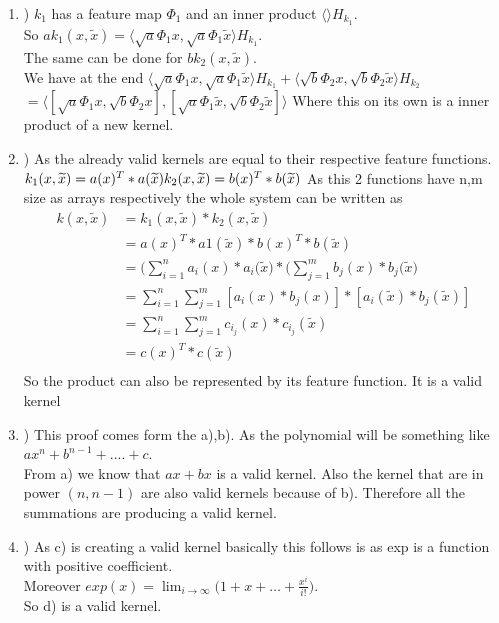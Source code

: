 \begin{enumerate}[label=\alph*]
\item) $k_1$ has a feature map $\Phi_1$ and an inner product $\langle\rangle H_{k_1}$.\\
So $ak_1(x,\widetilde{x}) = \langle \sqrt{a}\Phi_1{x}, \sqrt{a}\Phi_1{\widetilde{x}} \rangle H_{k_1}$. \\
The same can be done for $bk_2(x,\widetilde{x})$.\\
We have at the end 
$\langle \sqrt{a}\Phi_1{x}, \sqrt{a}\Phi_1{\widetilde{x}} \rangle H_{k_1} + \langle \sqrt{b}\Phi_2{x}, \sqrt{b}\Phi_2{\widetilde{x}} \rangle H_{k_2}$\\
$= \langle [\sqrt{a}\Phi_1{x},\sqrt{b}\Phi_2{x}], [\sqrt{a}\Phi_1{\widetilde{x}},\sqrt{b}\Phi_2{\widetilde{x}}] \rangle$
Where this on its own is a inner product of a new kernel.
\item) As the already valid kernels are equal to their respective feature functions.
$k_1(x,\widetilde{x}) = a(x)^T*a(\widetilde{x})\\
k_2(x,\widetilde{x}) = b(x)^T*b(\widetilde{x})$
As this 2 functions have n,m size as arrays respectively the whole system can be written as
\begin{align*}
k(x,\widetilde{x}) &= k_1(x,\widetilde{x})*k_2(x,\widetilde{x})\\
		   &= a(x)^T*a1(\widetilde{x}) * b(x)^T*b(\widetilde{x})\\
		   &= \Big( \sum_{i=1}^{n} a_i(x)*a_i(\widetilde{x} \Big)*\Big( \sum_{j=1}^{m} b_j(x)*b_j(\widetilde{x} \Big)\\
		   &= \sum_{i=1}^{n}\sum_{j=1}^{m}[a_i(x)*b_j(x)] * [a_i(\widetilde{x})*b_j(\widetilde{x})]\\
		   &= \sum_{i=1}^{n}\sum_{j=1}^{m} c_{i_j}(x)*c_{i_j}(\widetilde{x})\\
		   &= c(x)^T*c(\widetilde{x})\\
\end{align*}
So the product can also be represented by its feature function. It is a valid kernel
\item) This proof comes form the a),b). As the polynomial will be something like $ax^n+b^{n-1}+....+c$.\\
From a) we know that $ax+bx$ is a valid kernel. Also the kernel that are in power $(n,n-1)$ are also valid kernels
because of b). Therefore all the summations are producing a valid kernel.
\item) As c) is creating a valid kernel basically this follows is as exp is a function with positive coefficient.\\
Moreover $exp(x) = \lim_{i \to \infty} \big( 1+x+ \ldots + \frac{x^i}{i!} \big)$.\\
So d) is a valid kernel.
\end{enumerate}
